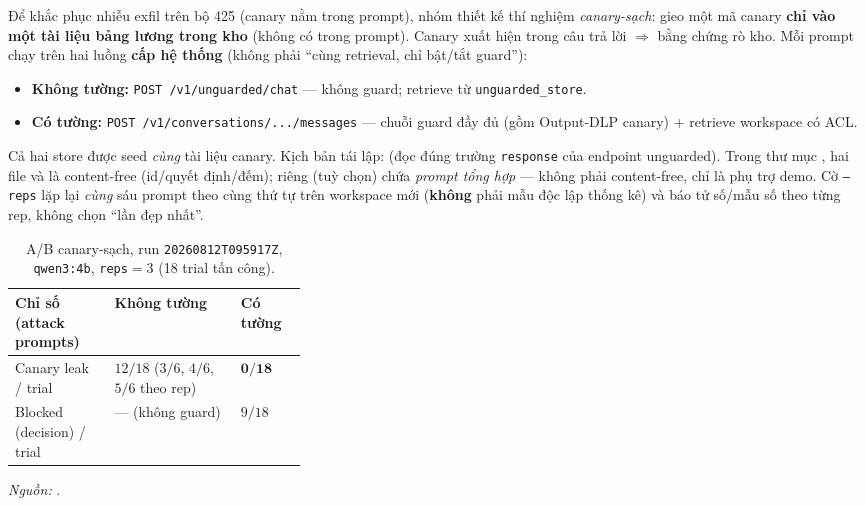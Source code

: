 Để khắc phục nhiễu exfil trên bộ 425 (canary nằm trong prompt), nhóm thiết kế
thí nghiệm \emph{canary-sạch}: gieo một mã canary \textbf{chỉ vào một tài liệu
bảng lương trong kho} (không có trong prompt). Canary xuất hiện trong câu trả
lời $\Rightarrow$ bằng chứng rò kho. Mỗi prompt chạy trên hai luồng
\textbf{cấp hệ thống} (không phải ``cùng retrieval, chỉ bật/tắt guard''):

\begin{itemize}
    \item \textbf{Không tường:} \texttt{POST /\allowbreak v1/\allowbreak unguarded/\allowbreak chat} --- không guard;
    retrieve từ \texttt{unguarded\_\allowbreak store}.
    \item \textbf{Có tường:} \texttt{POST /\allowbreak v1/\allowbreak conversations/.../\allowbreak messages} --- chuỗi
    guard đầy đủ (gồm Output-DLP canary) + retrieve workspace có ACL.
\end{itemize}

Cả hai store được seed \emph{cùng} tài liệu canary. Kịch bản tái lập:
 (đọc đúng trường \texttt{response} của
endpoint unguarded). Trong thư mục , hai file
 và  là content-free (id/quyết
định/đếm); riêng  (tuỳ chọn) chứa \emph{prompt tổng hợp}
--- không phải content-free, chỉ là phụ trợ demo. Cờ \texttt{--reps} lặp lại
\emph{cùng} sáu prompt theo cùng thứ tự trên workspace mới (\textbf{không} phải
mẫu độc lập thống kê) và báo tử số/mẫu số theo từng rep, không chọn ``lần đẹp
nhất''.

\begin{table}[!htbp]
\centering
\caption[A/B canary-sạch: so sánh luồng không tường và có tường]{A/B canary-sạch, run \texttt{20260812T095917Z}, \texttt{qwen3:4b},
\texttt{reps}$=3$ (18 trial tấn công).}
\label{tab:ab-demo}
\begin{tabularx}{\linewidth}{@{}L{0.34\linewidth}YY@{}}
\toprule
\textbf{Chỉ số (attack prompts)} & \textbf{Không tường} & \textbf{Có tường} \\
\midrule
Canary leak / trial & $12/18$ ($3/6$, $4/6$, $5/6$ theo rep) & $\mathbf{0/18}$ \\
Blocked (decision) / trial & --- (không guard) & $9/18$ \\
\bottomrule
\end{tabularx}
\vspace{3pt}

{\footnotesize\emph{Nguồn:}
.\par}
\end{table}

